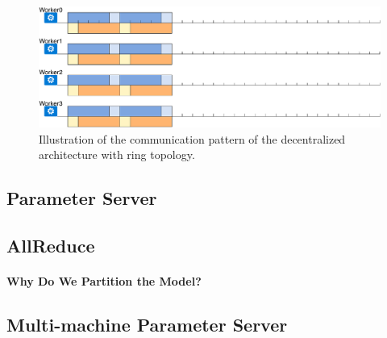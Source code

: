 \begin{figure}[t!]
\centering
\includegraphics[width=1.0\textwidth]{figures/Chpt1.3/Communication_pattern_decentralized.pdf}
\caption{Illustration of the communication
pattern of the decentralized  architecture with ring topology.}
\label{fig:communication_illustration_timeline_decent}
\end{figure}
\subsection{Parameter Server}

\subsection{AllReduce}

\paragraph{Why Do We Partition the Model?}


\subsection{Multi-machine Parameter Server}








